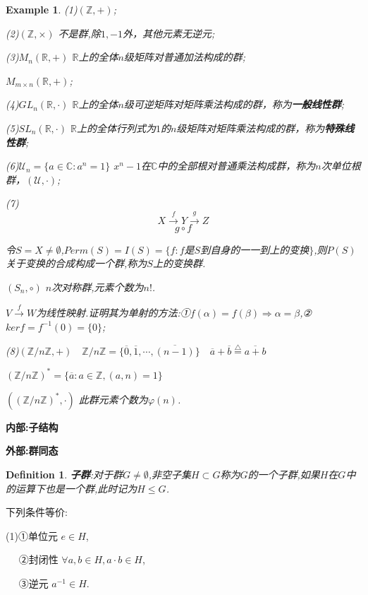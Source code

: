 \documentclass[UTF8]{article}
\newtheorem{defn}{Definition}[section]
\newtheorem{exa}{Example}[section]
\begin{document}
\begin{exa}
	\quad
	
	(1)$(\mathbb{Z},+)$;
	
	(2)$(\mathbb{Z},\times)$ 不是群,除$1,-1$外，其他元素无逆元;
	
	(3)$M_n(\mathbb{R},+)$ $\mathbb{R}$上的全体$n$级矩阵对普通加法构成的群;
	
	$M_{m\times n}(\mathbb{R},+)$;
	
	(4)$GL_n(\mathbb{R},\cdot)$ $\mathbb{R}$上的全体$n$级可逆矩阵对矩阵乘法构成的群，称为\textbf{一般线性群};
	
	(5)$SL_n(\mathbb{R},\cdot)$ $\mathbb{R}$上的全体行列式为$1$的$n$级矩阵对矩阵乘法构成的群，称为\textbf{特殊线性群};
	
	(6)$\mathcal{U}_n=\{a\in\mathbb{C}:a^n=1\}$ $x^n-1$在$\mathbb{C}$中的全部根对普通乘法构成群，称为$n$次单位根群，$(\mathcal{U},\cdot)$;
	
	(7)$$X\stackrel{f}{\to}Y\stackrel{g}{\to}Z$$
	$$g\circ f$$
	
	令$S=X\ne\emptyset$,$Perm(S)=I(S)=\{f:f$是$S$到自身的一一到上的变换$\}$,则$P(S)$关于变换的合成构成一个群,称为$S$上的变换群.
	
	$(S_n,\circ)$   $n$次对称群,元素个数为$n!$.
	
	$V\stackrel{f}{\to}W$为线性映射.证明其为单射的方法:①$f(\alpha)=f(\beta)\Rightarrow  \alpha=\beta$,②$ker f=f^{-1}(0)=\{0\}$;
	
	
	(8)$(\mathbb{Z}/n\mathbb{Z},+) \quad  \mathbb{Z}/n\mathbb{Z}=\{\overline{0},\overline{1},\cdots,\overline{(n-1)}\}  \quad \overline{a}+\overline{b}\stackrel{\bigtriangleup}{=}\overline{a+b}$ 
	
	$(\mathbb{Z}/n\mathbb{Z})^*=\{\overline{a}:a\in\mathbb{Z},(a,n)=1\}$    
	
	$((\mathbb{Z}/n\mathbb{Z})^*,\cdot)$  此群元素个数为$\varphi(n)$.
\end{exa}


\textbf{内部:子结构}

\textbf{外部:群同态}

\begin{defn}
	\textbf{子群}:对于群$G\ne\emptyset$,非空子集$H\subset G$称为$G$的一个子群,如果$H$在$G$中的运算下也是一个群,此时记为$H\le G$.
\end{defn}

下列条件等价:

(1)①单位元 $\mathit{e}\in H$,

$\quad$ ②封闭性 $\forall a,b\in H,a\cdot b\in H$,

$\quad$ ③逆元 $a^{-1}\in H$.
\end{document}
